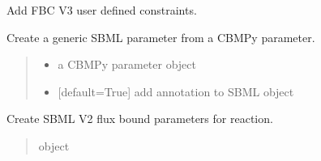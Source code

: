 \documentclass[letterpaper,12pt,english]{sphinxmanual}
\begin{document}
\begin{fulllineitems}
\begin{fulllineitems}
\label{\detokenize{api/io:cbmpy.CBXML.CBMtoSBML3.addUserDefinedConstraintsV3}}
\pysigstartsignatures
\pysiglinewithargsret
{}
{}
{}
\pysigstopsignatures
\sphinxAtStartPar
Add FBC V3 user defined constraints.

\end{fulllineitems}


\begin{fulllineitems}
\label{\detokenize{api/io:cbmpy.CBXML.CBMtoSBML3.createParParameter}}
\pysigstartsignatures
\pysiglinewithargsret
{}
{\sphinxparamcomma {}}
{}
\pysigstopsignatures
\sphinxAtStartPar
Create a generic SBML parameter from a CBMPy parameter.
\begin{quote}\begin{description}
\begin{itemize}
\item {} 
\sphinxAtStartPar
{} \textendash{} a CBMPy parameter object

\item {} 
\sphinxAtStartPar
{} \textendash{} {[}default=True{]} add annotation to SBML object

\end{itemize}

\end{description}\end{quote}

\end{fulllineitems}


\begin{fulllineitems}
\label{\detokenize{api/io:cbmpy.CBXML.CBMtoSBML3.createFbParameterV2}}
\pysigstartsignatures
\pysiglinewithargsret
{}
{\sphinxparamcomma {}}
{}
\pysigstopsignatures
\sphinxAtStartPar
Create SBML V2 flux bound parameters for reaction.
\begin{quote}\begin{description}
\sphinxAtStartPar
{} \textendash{} object


\end{description}
\end{quote}
\end{fulllineitems}
\end{fulllineitems}
\end{document}
